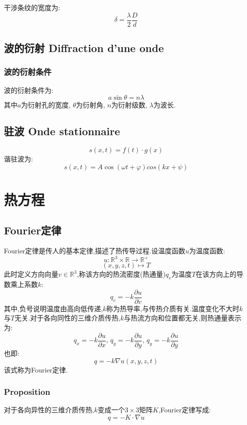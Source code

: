 \documentclass[12pt, a4paper, oneside]{ctexbook}
\newcommand{\pian }{\partial}%
\newcommand{\R }{\mathbb{R}}%
\begin{document}
  干涉条纹的宽度为:
  $$
  \delta=\frac{\lambda}{2}\frac{D}{d}
  $$

  \subsection{波的衍射 Diffraction d'une onde}
  \subsubsection{波的衍射条件}
  波的衍射条件为:
  $$
  a\sin\theta=n\lambda
  $$
  其中$a$为衍射孔的宽度,
  $\theta$为衍射角,
  $n$为衍射级数,
  $\lambda$为波长.
  \subsection{驻波 Onde stationnaire}
  $$
  s(x,t)=f(t)\cdot g(x)
  $$
  谐驻波为:
  $$
  s(x,t)=A\cos(\omega t+\varphi)cos(kx+\psi)
  $$
  






\section{热方程}
\subsection{Fourier定律}
  Fourier定律是传人的基本定律,描述了热传导过程.设温度函数$u$为温度函数:
  $$
    u:\R^3\times \R\rightarrow \R^+
  $$
  $$
    (x,y,z,t)\mapsto T
  $$
  此时定义方向向量$v\in\R^3$,称该方向的热流密度(热通量)$q_v$为温度$T$在该方向上的导数乘上系数$k$:
  $$
    q_v=-k\frac{\pian u}{\pian v}
  $$
  其中,负号说明温度由高向低传递,$k$称为热导率,与传热介质有关.温度变化不大时$k$与$T$无关.对于各向同性的三维介质传热,$k$与热流方向和位置都无关,则热通量表示为:
  $$
    q_x=-k\frac{\pian u}{\pian x},\,q_y=-k\frac{\pian u}{\pian y},\,q_y=-k\frac{\pian u}{\pian y}
  $$
  也即:
  $$
    q=-k\nabla u(x,y,z,t)
  $$
  该式称为Fourier定律.
  \subsubsection{Proposition}
  对于各向异性的三维介质传热,$k$变成一个$3\times 3$矩阵$K$,Fourier定律写成:
  $$
  q=-K\cdot \nabla u
  $$
\end{document}
